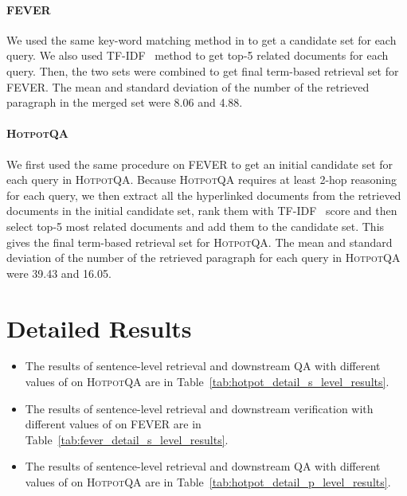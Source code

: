 \documentclass[11pt,a4paper]{article}
\newcommand\fever{FEVER\xspace}
\newcommand\hpqa{\textsc{HotpotQA}\xspace}
\begin{document}
\paragraph{FEVER}
We used the same key-word matching method in  to get a candidate set for each query. We also used TF-IDF~\cite{chen2017drqa} method to get top-5 related documents for each query. Then, the two sets were combined to get final term-based retrieval set for FEVER. The mean and standard deviation of the number of the retrieved paragraph in the merged set were 8.06 and 4.88.

\paragraph{\hpqa}
We first used the same procedure on \fever to get an initial candidate set for each query in \hpqa. Because \hpqa requires at least 2-hop reasoning for each query, we then extract all the hyperlinked documents from the retrieved documents in the initial candidate set, rank them with TF-IDF~\cite{chen2017drqa} score and then select top-5 most related documents and add them to the candidate set. This gives the final term-based retrieval set for \hpqa. The mean and standard deviation of the number of the retrieved paragraph for each query in \hpqa were 39.43 and 16.05.


\section{Detailed Results} 
\begin{itemize}
    \item The results of sentence-level retrieval and downstream QA with different values of  on \hpqa are in Table~\ref{tab:hotpot_detail_s_level_results}.
    \item The results of sentence-level retrieval and downstream verification with different values of  on \fever are in Table~\ref{tab:fever_detail_s_level_results}.
    \item The results of sentence-level retrieval and downstream QA with different values of  on \hpqa are in Table~\ref{tab:hotpot_detail_p_level_results}.
\end{itemize}
\end{document}
